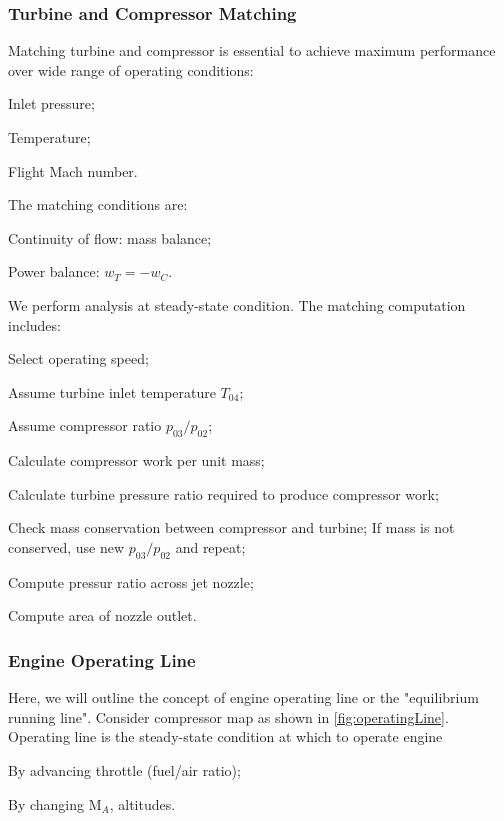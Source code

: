 \subsubsection{Turbine and Compressor Matching}
Matching turbine and compressor is essential to achieve maximum performance over wide range of operating conditions:
\begin{itemizePacked}
\item Inlet pressure;
\item Temperature;
\item Flight Mach number.
\end{itemizePacked}
The matching conditions are:
\begin{itemizePacked}
\item Continuity of flow: mass balance;
\item Power balance: $w_T = - w_C$.
\end{itemizePacked}

We perform analysis at steady-state condition. The matching computation includes:
\begin{itemizePacked}
\item Select operating speed;
\item Assume turbine inlet temperature $T_{04}$;
\item Assume compressor ratio $p_{03}/p_{02}$;
\item Calculate compressor work per unit mass;
\item Calculate turbine pressure ratio required to produce compressor work;
\item Check mass conservation between compressor and turbine; If mass is not conserved, use new $p_{03}/p_{02}$ and repeat;
\item Compute pressur ratio across jet nozzle;
\item Compute area of nozzle outlet.
\end{itemizePacked}

\subsubsection{Engine Operating Line}
Here, we will outline the concept of engine operating line or the "equilibrium running line". Consider compressor map as shown in \cref{fig:operatingLine}. Operating line is the steady-state condition at which to operate engine
\begin{itemizePacked}
\item By advancing throttle (fuel/air ratio);
\item By changing M$_A$, altitudes.
\end{itemizePacked}

